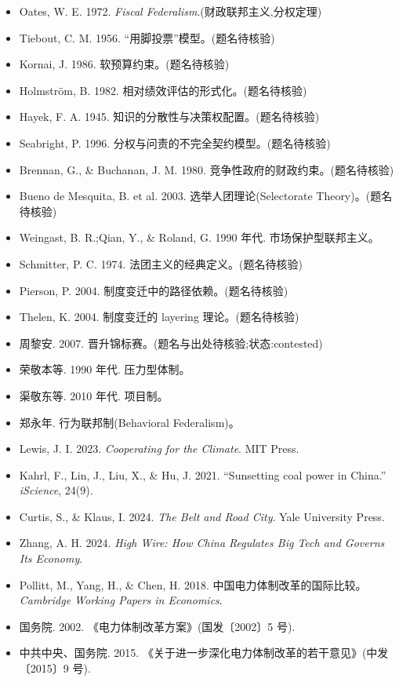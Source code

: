 \documentclass[UTF8,12pt,a4paper]{ctexrep}
\begin{document}
\begin{itemize}
  \item Oates, W. E. 1972. \emph{Fiscal Federalism}.(财政联邦主义,分权定理)
  \item Tiebout, C. M. 1956. ``用脚投票''模型。(题名待核验)
  \item Kornai, J. 1986. 软预算约束。(题名待核验)
  \item Holmstr\"om, B. 1982. 相对绩效评估的形式化。(题名待核验)
  \item Hayek, F. A. 1945. 知识的分散性与决策权配置。(题名待核验)
  \item Seabright, P. 1996. 分权与问责的不完全契约模型。(题名待核验)
  \item Brennan, G., \& Buchanan, J. M. 1980. 竞争性政府的财政约束。(题名待核验)
  \item Bueno de Mesquita, B. et al. 2003. 选举人团理论(Selectorate Theory)。(题名待核验)
  \item Weingast, B. R.;Qian, Y., \& Roland, G. 1990 年代. 市场保护型联邦主义。
  \item Schmitter, P. C. 1974. 法团主义的经典定义。(题名待核验)
  \item Pierson, P. 2004. 制度变迁中的路径依赖。(题名待核验)
  \item Thelen, K. 2004. 制度变迁的 layering 理论。(题名待核验)
  \item 周黎安. 2007. 晋升锦标赛。(题名与出处待核验;状态:contested)
  \item 荣敬本等. 1990 年代. 压力型体制。
  \item 渠敬东等. 2010 年代. 项目制。
  \item 郑永年. 行为联邦制(Behavioral Federalism)。
  \item Lewis, J. I. 2023. \emph{Cooperating for the Climate}. MIT Press.
  \item Kahrl, F., Lin, J., Liu, X., \& Hu, J. 2021. ``Sunsetting coal power in China.'' \emph{iScience}, 24(9).
  \item Curtis, S., \& Klaus, I. 2024. \emph{The Belt and Road City}. Yale University Press.
  \item Zhang, A. H. 2024. \emph{High Wire: How China Regulates Big Tech and Governs Its Economy}.
  \item Pollitt, M., Yang, H., \& Chen, H. 2018. 中国电力体制改革的国际比较。\emph{Cambridge Working Papers in Economics}.
  \item 国务院. 2002. 《电力体制改革方案》(国发〔2002〕5 号).
  \item 中共中央、国务院. 2015. 《关于进一步深化电力体制改革的若干意见》(中发〔2015〕9 号).

\end{itemize}
\end{document}
